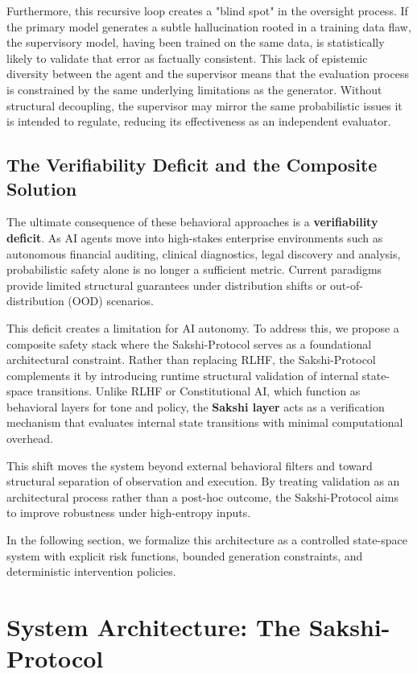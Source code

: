 \documentclass[12pt,a4paper]{article}
\begin{document}
Furthermore, this recursive loop creates a "blind spot" in the oversight process. If the primary model generates a subtle hallucination rooted in a training data flaw, the supervisory model, having been trained on the same data, is statistically likely to validate that error as factually consistent. This lack of epistemic diversity between the agent and the supervisor means that the evaluation process is constrained by the same underlying limitations as the generator. Without structural decoupling, the supervisor may mirror the same probabilistic issues it is intended to regulate, reducing its effectiveness as an independent evaluator.

\subsection{The Verifiability Deficit and the Composite Solution}
The ultimate consequence of these behavioral approaches is a \textbf{verifiability deficit}. As AI agents move into high-stakes enterprise environments such as autonomous financial auditing, clinical diagnostics, legal discovery and analysis, probabilistic safety alone is no longer a sufficient metric. Current paradigms provide limited structural guarantees under distribution shifts or out-of-distribution (OOD) scenarios.

This deficit creates a limitation for AI autonomy. To address this, we propose a composite safety stack where the Sakshi-Protocol serves as a foundational architectural constraint. Rather than replacing RLHF, the Sakshi-Protocol complements it by introducing runtime structural validation of internal state-space transitions. Unlike RLHF or Constitutional AI, which function as behavioral layers for tone and policy, the \textbf{Sakshi layer} acts as a verification mechanism that evaluates internal state transitions with minimal computational overhead.

This shift moves the system beyond external behavioral filters and toward structural separation of observation and execution. By treating validation as an architectural process rather than a post-hoc outcome, the Sakshi-Protocol aims to improve robustness under high-entropy inputs.

In the following section, we formalize this architecture as a controlled state-space system with explicit risk functions, bounded generation constraints, and deterministic intervention policies.

\section{System Architecture: The Sakshi-Protocol}
\end{document}

